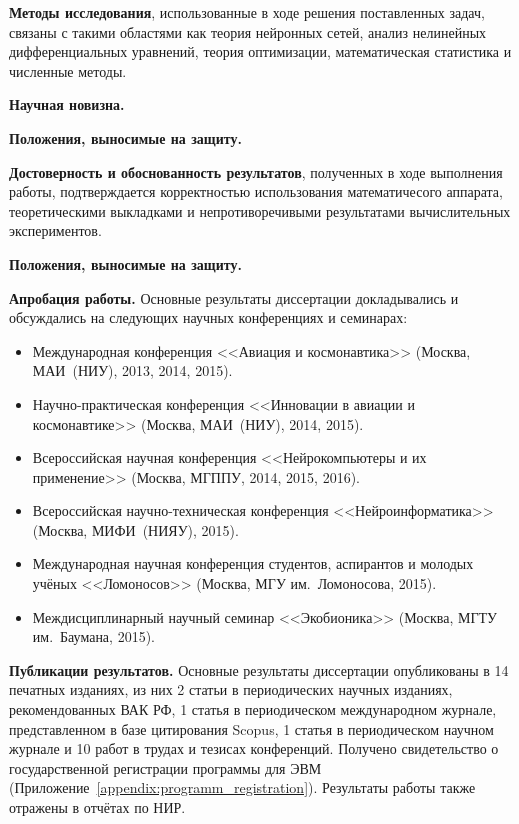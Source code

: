 \textbf{Методы исследования}, использованные в ходе решения поставленных задач, связаны с такими областями как теория нейронных сетей, анализ нелинейных дифференциальных уравнений, теория оптимизации, математическая статистика и численные методы.

\textbf{Научная новизна.}  %

\textbf{Положения, выносимые на защиту.} 

\textbf{Достоверность и обоснованность результатов}, полученных в ходе выполнения работы, подтверждается корректностью использования математичесого аппарата, теоретическими выкладками и непротиворечивыми результатами вычислительных экспериментов.

\textbf{Положения, выносимые на защиту.} 

\textbf{Апробация работы.} Основные результаты диссертации докладывались и обсуждались на следующих научных конференциях и семинарах:
\begin{itemize}[label=$\bullet$]
    \item Международная конференция <<Авиация и космонавтика>> (Москва, МАИ~(НИУ), 2013, 2014, 2015).
    \item Научно-практическая конференция <<Инновации в авиации и космонавтике>> (Москва, МАИ~(НИУ), 2014, 2015).
    \item Всероссийская научная конференция <<Нейрокомпьютеры и их применение>> (Москва, МГППУ, 2014, 2015, 2016).
    \item Всероссийская научно-техническая конференция <<Нейроинформатика>> (Москва, МИФИ~(НИЯУ), 2015).
    \item Международная научная конференция студентов, аспирантов и молодых учёных <<Ломоносов>> (Москва, МГУ им.~Ломоносова, 2015).
    \item Междисциплинарный научный семинар <<Экобионика>> (Москва, МГТУ им.~Баумана, 2015).
\end{itemize}

\textbf{Публикации результатов.} Основные результаты диссертации опубликованы в 14 печатных изданиях, из них 2 статьи в периодических научных изданиях, рекомендованных ВАК РФ, 1 статья в периодическом международном журнале, представленном в базе цитирования Scopus, 1 статья в периодическом научном журнале и 10 работ в трудах и тезисах конференций. Получено свидетельство о государственной регистрации программы для ЭВМ (Приложение~\ref{appendix:programm_registration}). Результаты работы также отражены в отчётах по НИР.

